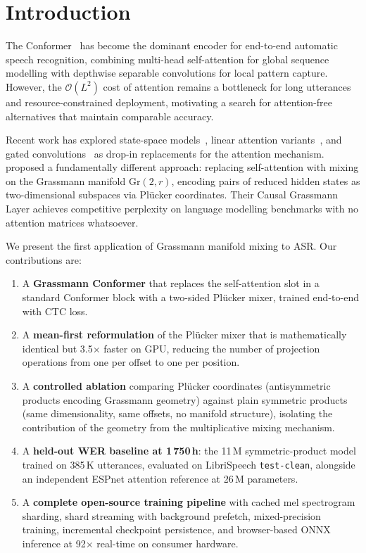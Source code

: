 \documentclass[11pt,a4paper]{article}
\newcommand{\Gr}{\mathrm{Gr}}
\newcommand{\plucker}{Pl\"{u}cker}
\begin{document}
\section{Introduction}
\label{sec:intro}

The Conformer~\citep{gulati2020conformer} has become the dominant
encoder for end-to-end automatic speech recognition, combining
multi-head self-attention for global sequence modelling with depthwise
separable convolutions for local pattern capture.  However, the
$\mathcal{O}(L^2)$ cost of attention remains a bottleneck for long
utterances and resource-constrained deployment, motivating a search for
attention-free alternatives that maintain comparable accuracy.

Recent work has explored state-space models~\citep{gu2023mamba}, linear
attention variants~\citep{katharopoulos2020linear}, and gated
convolutions~\citep{dauphin2017language} as drop-in replacements for the
attention mechanism.  \citet{dong2025attention} proposed a fundamentally
different approach: replacing self-attention with mixing on the
Grassmann manifold $\Gr(2,r)$, encoding pairs of reduced hidden states
as two-dimensional subspaces via \plucker{} coordinates.  Their Causal
Grassmann Layer achieves competitive perplexity on language modelling
benchmarks with no attention matrices whatsoever.

We present the first application of Grassmann manifold mixing to ASR.
Our contributions are:
\begin{enumerate}
  \item A \textbf{Grassmann Conformer} that replaces the self-attention
    slot in a standard Conformer block with a two-sided \plucker{} mixer,
    trained end-to-end with CTC loss.
  \item A \textbf{mean-first reformulation} of the \plucker{} mixer
    that is mathematically identical but 3.5$\times$ faster on GPU, reducing
    the number of projection operations from one per offset to one per
    position.
  \item A \textbf{controlled ablation} comparing \plucker{} coordinates
    (antisymmetric products encoding Grassmann geometry) against plain
    symmetric products (same dimensionality, same offsets, no manifold
    structure), isolating the contribution of the geometry from the
    multiplicative mixing mechanism.
  \item A \textbf{held-out WER baseline at 1\,750\,h}: the 11\,M
    symmetric-product model trained on 385\,K utterances, evaluated on
    LibriSpeech \texttt{test-clean}, alongside an independent ESPnet
    attention reference at 26\,M parameters.
  \item A \textbf{complete open-source training pipeline} with cached
    mel spectrogram sharding, shard streaming with background prefetch,
    mixed-precision training, incremental checkpoint persistence, and
    browser-based ONNX inference at 92$\times$ real-time on consumer
    hardware.
\end{enumerate}
\end{document}
